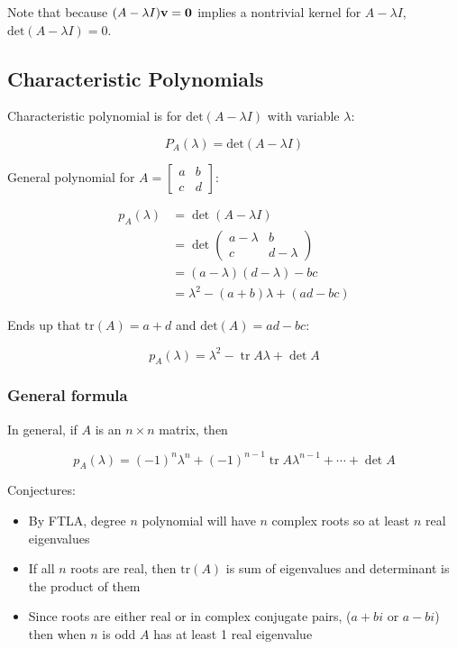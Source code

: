 Note that because $(A-\lambda I)\textbf{v}=\textbf{0}$ implies a nontrivial kernel for $A-\lambda I$, $\mathrm{det}(A-\lambda I)=0$.

\subsection{Characteristic Polynomials}

Characteristic polynomial is for $\mathrm{det}(A-\lambda I)$ with variable $\lambda$: 

\[\boxed{P_A(\lambda)=\mathrm{det}(A-\lambda I)}\]

General polynomial for $A=\begin{bmatrix}a&b\\c&d\end{bmatrix}$:

\[
    \begin{aligned}
        p_{A}(\lambda) &=\operatorname{det}(A-\lambda I) \\
        &=\operatorname{det}\left(\begin{array}{cc}
        a-\lambda & b \\
        c & d-\lambda
        \end{array}\right) \\
        &=(a-\lambda)(d-\lambda)-b c \\
        &=\lambda^{2}-(a+b) \lambda+(a d-b c)    
    \end{aligned}
\]

Ends up that $\mathrm{tr}(A)=a+d$ and $\mathrm{det}(A)=ad-bc$:

\[\boxed{p_{A}(\lambda)=\lambda^{2}-\operatorname{tr} A \lambda+\operatorname{det} A}\]

\subsubsection{General formula}

In general, if $A$ is an $n\times n$ matrix, then

\[\boxed{p_{A}(\lambda)=(-1)^{n} \lambda^{n}+(-1)^{n-1} \operatorname{tr} A \lambda^{n-1}+\cdots+\operatorname{det} A}\]

Conjectures:
\begin{itemize}
    \item By FTLA, degree $n$ polynomial will have $n$ complex roots so at least $n$ real eigenvalues
    \item If all $n$ roots are real, then $\mathrm{tr}(A)$ is sum of eigenvalues and determinant is the product of them
    \item Since roots are either real or in complex conjugate pairs, ($a+bi$ or $a-bi$) then when $n$ is odd $A$ has at least 1 real eigenvalue
\end{itemize}